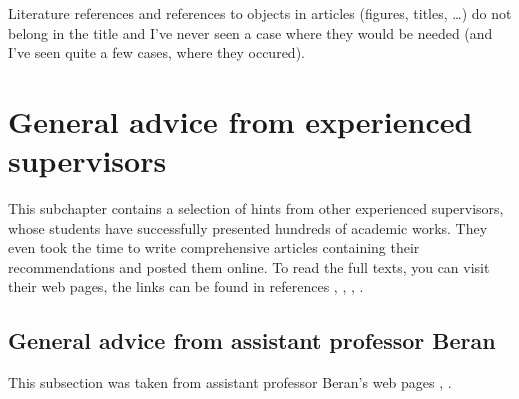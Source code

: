 Literature references and references to objects in articles (figures, titles, \ldots) do not belong in the title and I've never seen a case where they would be needed (and I've seen quite a few cases, where they occured).


\section{General advice from experienced supervisors}

This subchapter contains a selection of hints from other experienced supervisors, whose students have successfully presented hundreds of academic works. They even took the time to write comprehensive articles containing their recommendations and posted them online. To read the full texts, you can visit their web pages, the links can be found in references \cite{Beran}, \cite{BeranPDF}, \cite{Cernocky}, \cite{Zemcik}.

\subsection*{General advice from assistant professor Beran}

This subsection was taken from assistant professor Beran's web pages \cite{Beran}, \cite{BeranPDF}.

